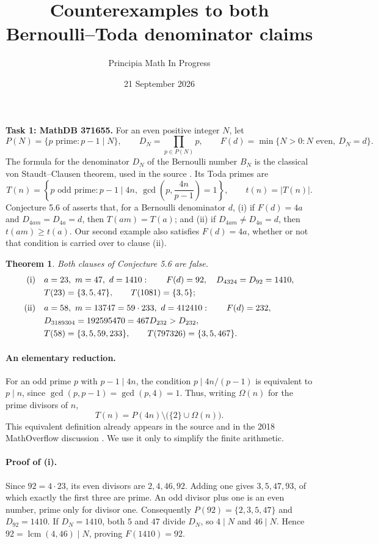 \documentclass[11pt]{article}
\title{Counterexamples to both Bernoulli--Toda denominator claims}
\author{Principia Math In Progress}
\date{21 September 2026}
\newtheorem{theorem}{Theorem}
\begin{document}
\maketitle
\noindent\textbf{Task 1: MathDB 371655.}
For an even positive integer $N$, let
\[
 P(N)=\{p\text{ prime}:p-1\mid N\},\qquad
 D_N=\prod_{p\in P(N)}p,
 \qquad F(d)=\min\{N>0:N\text{ even},\ D_N=d\}.
\]
The formula for the denominator $D_N$ of the Bernoulli number $B_N$
is the classical von Staudt--Clausen theorem, used in the source
\cite[Section 5.1]{M}. Its Toda primes are
\[
 T(n)=\left\{p\text{ odd prime}:p-1\mid4n,
        \ \gcd\left(p,\frac{4n}{p-1}\right)=1\right\},
 \qquad t(n)=|T(n)|.
\]
Conjecture 5.6 of \cite{M} asserts that, for a Bernoulli denominator $d$,
(i) if $F(d)=4a$ and $D_{4am}=D_{4a}=d$, then $T(am)=T(a)$;
and (ii) if $D_{4am}\ne D_{4a}=d$, then $t(am)\geq t(a)$.
Our second example also satisfies $F(d)=4a$, whether or not that
condition is carried over to clause (ii).

\begin{theorem}
Both clauses of Conjecture 5.6 are false.
\begin{align*}
 \textup{(i)}\quad &a=23,\ m=47,\ d=1410:\qquad
 F(d)=92,\quad D_{4324}=D_{92}=1410,\\
 &T(23)=\{3,5,47\},\qquad T(1081)=\{3,5\};\\[3pt]
 \textup{(ii)}\quad &a=58,\ m=13747=59\cdot233,\ d=412410:\qquad
 F(d)=232,\\
 &D_{3189304}=192595470=467D_{232}>D_{232},\\
 &T(58)=\{3,5,59,233\},\qquad
 T(797326)=\{3,5,467\}.
\end{align*}
\end{theorem}

\paragraph{An elementary reduction.}
For an odd prime $p$ with $p-1\mid4n$, the condition
$p\mid4n/(p-1)$ is equivalent to $p\mid n$, since
$\gcd(p,p-1)=\gcd(p,4)=1$. Thus, writing $\Omega(n)$ for the prime
divisors of $n$,
\begin{equation}\label{T}
 T(n)=P(4n)\setminus\bigl(\{2\}\cup\Omega(n)\bigr).
\end{equation}
This equivalent definition already appears in the source and in
the 2018 MathOverflow discussion \cite{MO}. We use it only to simplify
the finite arithmetic.

\paragraph{Proof of (i).}
Since $92=4\cdot23$, its even divisors are $2,4,46,92$.
Adding one gives $3,5,47,93$, of which exactly the first three are prime.
An odd divisor plus one is an even number, prime only for divisor one.
Consequently $P(92)=\{2,3,5,47\}$ and $D_{92}=1410$.
If $D_N=1410$, both $5$ and $47$ divide $D_N$, so $4\mid N$ and
$46\mid N$. Hence $92=\operatorname{lcm}(4,46)\mid N$, proving
$F(1410)=92$.
\end{document}
